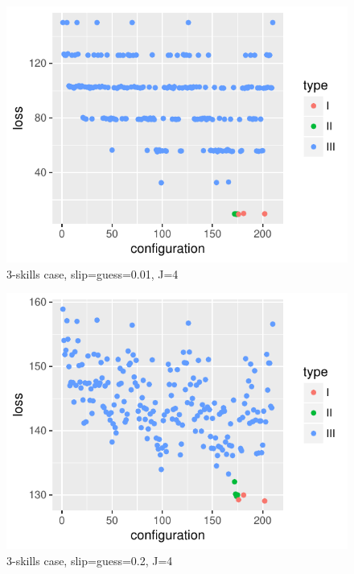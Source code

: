 \documentclass{edm_template}
\begin{document}
\begin{figure}[h!]
  \begin{center}
  \includegraphics[width=\columnwidth]{simResults/LossBestConfig_theta001_J4.pdf}
  \end{center}
  \caption{3-skills case, slip=guess=0.01, J=4}  
  \label{fig:theta001J4ThreeSkill}
\end{figure}

\begin{figure}[h!]
  \begin{center}
  \includegraphics[width=\columnwidth]{simResults/LossBestConfig_theta02_J4.pdf}
  \end{center}
  \caption{3-skills case, slip=guess=0.2, J=4}  
  \label{fig:theta021J4ThreeSkill}
\end{figure}
\end{document}
